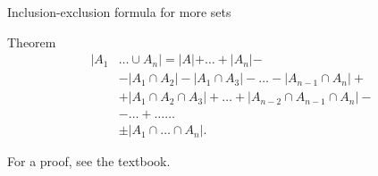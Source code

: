 \documentclass{beamer}
\def\bl[#1]#2{\begin{block}{#1}#2\end{block}}
\begin{document}
\begin{frame}{Inclusion-exclusion formula for more sets}

\bl[Theorem]{\vspace{-0.5cm}
\begin{align*}
|A_1&\dots\cup A_n|=|A|+\dots+|A_n|-\\
&-|A_1\cap A_2|-|A_1\cap A_3|-\dots-|A_{n-1}\cap A_n|+\\
&+|A_1\cap A_2\cap A_3|+\dots+|A_{n-2}\cap A_{n-1}\cap A_n|-\\
&-\dots+\dots\dots\\
&\pm|A_1\cap \dots \cap A_n|.
\end{align*}
}
For a proof, see the textbook.

\end{frame}
\end{document}
